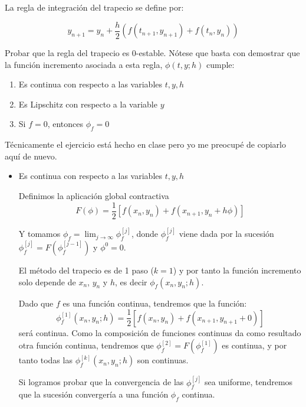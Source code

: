 \begin{problem}[7]
La regla de integración del trapecio se define por:

\[y_{n+1} = y_n + \frac{h}{2}\left( f(t_{n+1},y_{n+1})+f(t_n,y_n)\right)\]

Probar que la regla del trapecio es 0-estable. Nótese que basta con demostrar que la función incremento asociada a esta regla, $\phi(t,y;h)$ cumple:
\begin{enumerate}
\item Es continua con respecto a las variables $t,y,h$
\item Es Lipschitz con respecto a la variable $y$
\item Si $f=0$, entonces $\phi_f=0$
\end{enumerate}
\solution


Técnicamente el ejercicio está hecho en clase pero yo me preocupé de copiarlo aquí de nuevo.

\begin{itemize}
\item Es continua con respecto a las variables $t,y,h$

Definimos la aplicación global contractiva
\[F(\phi) = \frac{1}{2} \left[ f(x_n,y_n) + f(x_{n+1}, y_n+h\phi) \right]\]

Y tomamos $\phi_f = \lim_{j\to∞} \phi_f^{[j]}$, donde $\phi_f^{[j]}$ viene dada por la sucesión $\phi_f^{[j]} = F\left(\phi_f^{[j-1]}\right)$ y $\phi^0 = 0$.

\obs El método del trapecio es de 1 paso ($k=1$) y por tanto la función incremento solo depende de $x_n$, $y_n$ y $h$, es decir $\phi_f(x_n,y_n;h)$.

Dado que $f$ es una función continua, tendremos que la función:
\[\phi_f^{[1]}(x_n,y_n;h) = \frac{1}{2} \left[ f(x_n,y_n) + f(x_{n+1}, y_{n+1} + 0) \right]\]
será continua. Como la composición de funciones continuas da como resultado otra función continua, tendremos que $\phi_f^{[2]}=F\left( \phi_f^{[1]} \right)$ es continua, y por tanto todas las $\phi_f^{[k]}(x_n,y_n;h)$ son continuas.

Si logramos probar que la convergencia de las $\phi_f^{[j]}$ sea uniforme, tendremos que la sucesión convergería a una función $\phi_f$ continua.


\end{itemize}
\end{problem}
